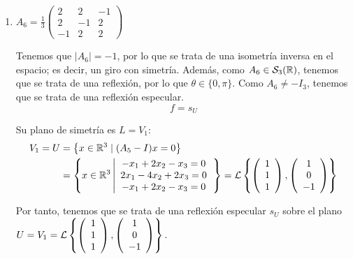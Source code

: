 \begin{ejercicio}
\begin{enumerate}
        \item $A_6=\frac{1}{3}\left(\begin{array}{ccc}
            2 & 2 & -1 \\
            2 & -1 & 2 \\
            -1 & 2 & 2
        \end{array}\right)$

        Tenemos que $|A_6|=-1$, por lo que se trata de una isometría inversa en el espacio; es decir, un giro con simetría. Además, como $A_6\in \mathcal{S}_3(\mathbb{R})$, tenemos que se trata de una reflexión, por lo que $\theta\in \{0,\pi\}$. Como $A_6\neq -I_3$, tenemos que se trata de una reflexión especular.
        \begin{equation*}
            f=s_U
        \end{equation*}

        Su plano de simetría es $L=V_{1}$:
        \begin{equation*}
            \begin{split}
                V_{1}=U& = \left\{x\in \mathbb{R}^3 \mid (A_5-I)x=0\right\}\\
                & = \left\{x\in \mathbb{R}^3 \left|
                \begin{array}{c}
                    -x_1+2x_2-x_3=0 \\
                    2x_1-4x_2+2x_3=0 \\
                    -x_1+2x_2-x_3=0
                \end{array}
                \right.\right\}
                = \mathcal{L}\left\{\left(\begin{array}{c}
                     1 \\ 1 \\ 1
                \end{array}\right),
                \left(\begin{array}{c}
                     1 \\ 0 \\ -1
                \end{array}\right)\right\}
            \end{split}
        \end{equation*}


        Por tanto, tenemos que se trata de una reflexión especular $s_U$ sobre el plano $U=V_1=\mathcal{L}\left\{\left(\begin{array}{c}
                     1 \\ 1 \\ 1
                \end{array}\right),
                \left(\begin{array}{c}
                     1 \\ 0 \\ -1
                \end{array}\right)\right\}.$
                
    \end{enumerate}
\end{ejercicio}



